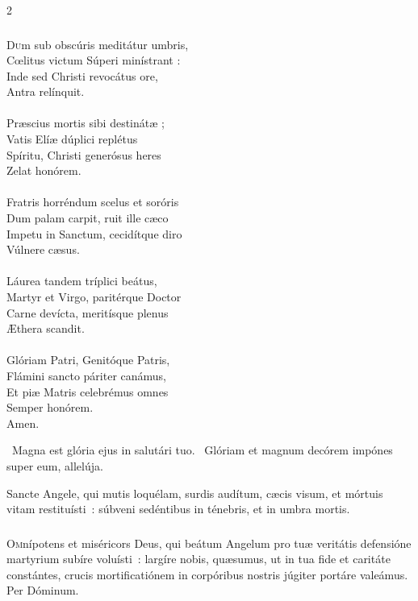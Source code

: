 \documentclass[9pt,twoside]{extarticle}
\begin{document}
\begin{multicols}{2}
{\subsubsection*{\center {}}
\lettrine{D}um sub obscúris meditátur umbris,\\
Cœlitus victum Súperi minístrant :\\
Inde sed Christi revocátus ore,\\
Antra relínquit.\\
\\
Præscius mortis sibi destinátæ ;\\
Vatis Elíæ dúplici replétus\\
Spíritu, Christi generósus heres\\
Zelat honórem.\\
\\
Fratris horréndum scelus et soróris\\
Dum palam carpit, ruit ille cæco\\
Impetu in Sanctum, cecidítque diro\\
Vúlnere cæsus.\\
\\
Láurea tandem tríplici beátus,\\
Martyr et Virgo, paritérque Doctor\\
Carne devícta, meritísque plenus\\
Æthera scandit.\\
\\
Glóriam Patri, Genitóque Patris,\\
Flámini sancto páriter canámus,\\
Et piæ Matris celebrémus omnes\\
Semper honórem.\\
Amen.

\begin{tightlist}{}
\item {}~Magna est glória ejus in salutári tuo. ~Glóriam et magnum decórem impónes super eum, allelúja.
\item {} Sancte Angele, qui mutis loquélam, surdis audítum, cæcis visum, et mórtuis vitam restituísti~: súbveni sedéntibus in ténebris, et in umbra mortis.
\end{tightlist}

\subsubsection*{\center {}}
\lettrine{O}mnípotens et miséricors Deus, qui beátum Angelum pro tuæ veritátis defensióne martyrium subíre voluísti~: largíre nobis, quæsumus, ut in tua fide et caritáte constántes, crucis mortificatiónem in corpóribus nostris júgiter portáre valeámus. Per Dóminum.

}
\end{multicols}
\end{document}

